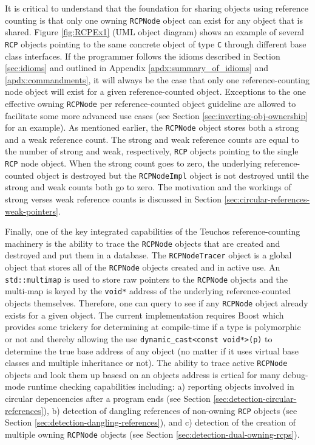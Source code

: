 \documentclass[pdf,ps2pdf,11pt]{SANDreport}
\begin{document}
It is critical to understand that the foundation for sharing objects
using reference counting is that only one owning {}\texttt{RCPNode}
object can exist for any object that is shared.  Figure
{}\ref{fig:RCPEx1} (UML object diagram) shows an example of several
{}\texttt{RCP} objects pointing to the same concrete object of type
{}\texttt{C} through different base class interfaces.  If the
programmer follows the idioms described in Section {}\ref{sec:idioms}
and outlined in Appendix {}\ref{apdx:summary_of_idioms} and
{}\ref{apdx:commandments}, it will always be the case that only one
reference-counting node object will exist for a given
reference-counted object.  Exceptions to the one effective owning
{}\texttt{RCPNode} per reference-counted object guideline are allowed
to facilitate some more advanced use cases (see Section
{}\ref{sec:inverting-obj-ownership} for an example).  As mentioned
earlier, the {}\texttt{RCPNode} object stores both a strong and a weak
reference count.  The strong and weak reference counts are equal to
the number of strong and weak, respectively, {}\texttt{RCP} objects
pointing to the single {}\texttt{RCP} node object.  When the strong
count goes to zero, the underlying reference-counted object is
destroyed but the {}\texttt{RCPNodeImpl} object is not destroyed until
the strong and weak counts both go to zero.  The motivation and the
workings of strong verses weak reference counts is discussed in
Section {}\ref{sec:circular-references-weak-pointers}.

Finally, one of the key integrated capabilities of the Teuchos
reference-counting machinery is the ability to trace the
{}\texttt{RCPNode} objects that are created and destroyed and put them
in a database.  The {}\texttt{RCPNodeTracer} object is a global object
that stores all of the {}\texttt{RCPNode} objects created and in
active use.  An {}\texttt{std::multimap} is used to store raw pointers
to the {}\texttt{RCPNode} objects and the multi-map is keyed by the
{}\texttt{void*} address of the underlying reference-counted objects
themselves.  Therefore, one can query to see if any {}\texttt{RCPNode}
object already exists for a given object.  The current implementation
requires Boost which provides some trickery for determining at
compile-time if a type is polymorphic or not and thereby allowing the
use {}\texttt{dynamic\_cast<const void*>(p)} to determine the true
base address of any object (no matter if it uses virtual base classes
and multiple inheritance or not).  The ability to trace active
{}\texttt{RCPNode} objects and look them up basesd on an objects
address is crtical for many debug-mode runtime checking capabilities
including: a) reporting objects involved in circular depencencies
after a program ends (see Section
{}\ref{sec:detection-circular-references}), b) detection of dangling
references of non-owning {}\texttt{RCP} objects (see Section
{}\ref{sec:detection-dangling-references}), and c) detection of the
creation of multiple owning {}\texttt{RCPNode} objects (see Section
{}\ref{sec:detection-dual-owning-rcps}).
\end{document}
